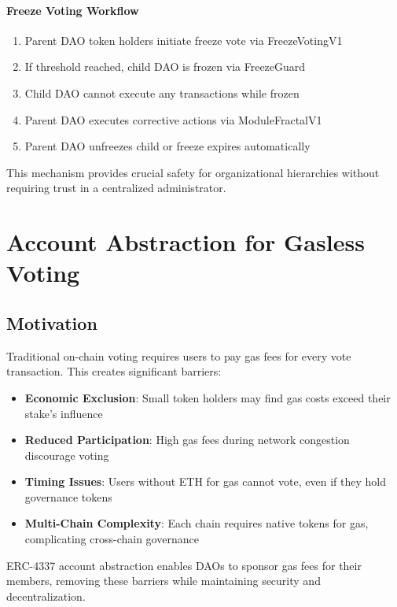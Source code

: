 \documentclass[11pt,a4paper]{article}
\begin{document}
\paragraph{Freeze Voting Workflow}

\begin{enumerate}
    \item Parent DAO token holders initiate freeze vote via FreezeVotingV1
    \item If threshold reached, child DAO is frozen via FreezeGuard
    \item Child DAO cannot execute any transactions while frozen
    \item Parent DAO executes corrective actions via ModuleFractalV1
    \item Parent DAO unfreezes child or freeze expires automatically
\end{enumerate}

This mechanism provides crucial safety for organizational hierarchies without requiring trust in a centralized administrator.

\section{Account Abstraction for Gasless Voting}

\subsection{Motivation}

Traditional on-chain voting requires users to pay gas fees for every vote transaction. This creates significant barriers:

\begin{itemize}
    \item \textbf{Economic Exclusion}: Small token holders may find gas costs exceed their stake's influence
    \item \textbf{Reduced Participation}: High gas fees during network congestion discourage voting
    \item \textbf{Timing Issues}: Users without ETH for gas cannot vote, even if they hold governance tokens
    \item \textbf{Multi-Chain Complexity}: Each chain requires native tokens for gas, complicating cross-chain governance
\end{itemize}

ERC-4337 account abstraction enables DAOs to sponsor gas fees for their members, removing these barriers while maintaining security and decentralization.
\end{document}
